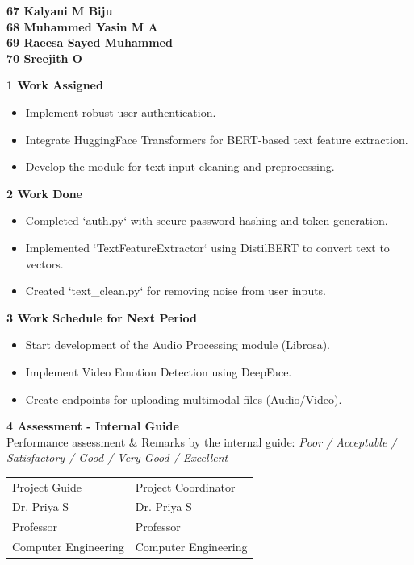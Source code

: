 \documentclass[12pt,a4paper]{article}
\begin{document}
\begin{center}
\textbf{67  Kalyani M Biju\\
68 Muhammed Yasin M A\\
69 Raeesa Sayed Muhammed\\
70 Sreejith O\\[1.5em]}
\end{center}

\noindent\textbf{1 \quad Work Assigned}
\begin{itemize}
    \item Implement robust user authentication.
    \item Integrate HuggingFace Transformers for BERT-based text feature extraction.
    \item Develop the module for text input cleaning and preprocessing.
\end{itemize}

\noindent\textbf{2 \quad Work Done}
\begin{itemize}
    \item Completed `auth.py` with secure password hashing and token generation.
    \item Implemented `TextFeatureExtractor` using DistilBERT to convert text to vectors.
    \item Created `text_clean.py` for removing noise from user inputs.
\end{itemize}

\noindent\textbf{3 \quad Work Schedule for Next Period}
\begin{itemize}
    \item Start development of the Audio Processing module (Librosa).
    \item Implement Video Emotion Detection using DeepFace.
    \item Create endpoints for uploading multimodal files (Audio/Video).
\end{itemize}


\noindent\textbf{4 \quad Assessment - Internal Guide}\\[0.5em]
Performance assessment \& Remarks by the internal guide: \textit{Poor / Acceptable /}\\
\textit{Satisfactory / Good / Very Good / Excellent}\\[3em]

\noindent
\begin{tabular}{p{} p{}}
Project Guide & Project Coordinator\\[0.5em]
Dr. Priya S & Dr. Priya S\\
Professor & Professor\\
Computer Engineering & Computer Engineering\\
\end{tabular}
\end{document}
